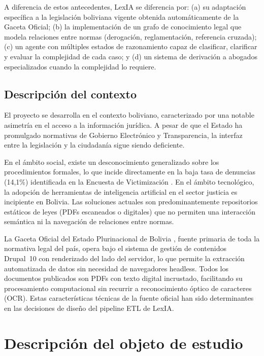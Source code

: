 \documentclass[12pt, letterpaper]{report}
\begin{document}
A diferencia de estos antecedentes, LexIA se diferencia por: (a) su adaptaci\'{o}n espec\'{i}fica a la legislaci\'{o}n boliviana vigente obtenida autom\'{a}ticamente de la Gaceta Oficial; (b) la implementaci\'{o}n de un grafo de conocimiento legal que modela relaciones entre normas (derogaci\'{o}n, reglamentaci\'{o}n, referencia cruzada); (c) un agente con m\'{u}ltiples estados de razonamiento capaz de clasificar, clarificar y evaluar la complejidad de cada caso; y (d) un sistema de derivaci\'{o}n a abogados especializados cuando la complejidad lo requiere.

\subsection{Descripci\'{o}n del contexto}

El proyecto se desarrolla en el contexto boliviano, caracterizado por una notable asimetr\'{i}a en el acceso a la informaci\'{o}n jur\'{i}dica. A pesar de que el Estado ha promulgado normativas de Gobierno Electr\'{o}nico y Transparencia, la interfaz entre la legislaci\'{o}n y la ciudadan\'{i}a sigue siendo deficiente.

En el \'{a}mbito social, existe un desconocimiento generalizado sobre los procedimientos formales, lo que incide directamente en la baja tasa de denuncias (14,1\%) identificada en la Encuesta de Victimizaci\'{o}n \cite{tic_bolivia_2025}. En el \'{a}mbito tecnol\'{o}gico, la adopci\'{o}n de herramientas de inteligencia artificial en el sector justicia es incipiente en Bolivia. Las soluciones actuales son predominantemente repositorios est\'{a}ticos de leyes (PDFs escaneados o digitales) que no permiten una interacci\'{o}n sem\'{a}ntica ni la navegaci\'{o}n de relaciones entre normas.

La Gaceta Oficial del Estado Plurinacional de Bolivia \cite{gaceta_oficial}, fuente primaria de toda la normativa legal del pa\'{i}s, opera bajo el sistema de gesti\'{o}n de contenidos Drupal~10 con renderizado del lado del servidor, lo que permite la extracci\'{o}n automatizada de datos sin necesidad de navegadores headless. Todos los documentos publicados son PDFs con texto digital incrustado, facilitando su procesamiento computacional sin recurrir a reconocimiento \'{o}ptico de caracteres (OCR). Estas caracter\'{i}sticas t\'{e}cnicas de la fuente oficial han sido determinantes en las decisiones de dise\~{n}o del pipeline ETL de LexIA.

\section{Descripci\'{o}n del objeto de estudio}
\end{document}
